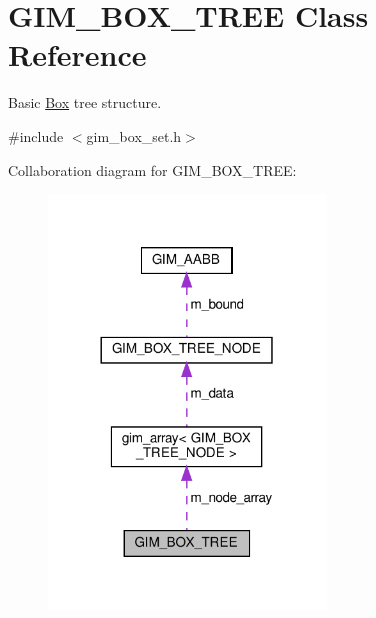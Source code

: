 \hypertarget{classGIM__BOX__TREE}{}\section{G\+I\+M\+\_\+\+B\+O\+X\+\_\+\+T\+R\+EE Class Reference}
\label{classGIM__BOX__TREE}


Basic \hyperlink{classBox}{Box} tree structure.  




{\ttfamily \#include $<$gim\+\_\+box\+\_\+set.\+h$>$}



Collaboration diagram for G\+I\+M\+\_\+\+B\+O\+X\+\_\+\+T\+R\+EE\+:
\nopagebreak
\begin{figure}[H]
\begin{center}
\leavevmode
\includegraphics[width=209pt]{classGIM__BOX__TREE__coll__graph}
\end{center}
\end{figure}
